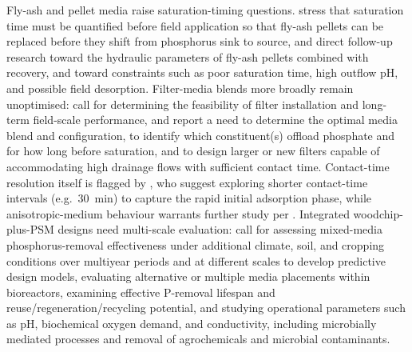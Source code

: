 Fly-ash and pellet media raise saturation-timing questions. \textcite{Li2017} stress that saturation time must be quantified before field application so that fly-ash pellets can be replaced before they shift from phosphorus sink to source, and \textcite{Li2018b} direct follow-up research toward the hydraulic parameters of fly-ash pellets combined with recovery, and toward constraints such as poor saturation time, high outflow pH, and possible field desorption. Filter-media blends more broadly remain unoptimised: \textcite{Agrawal2011} call for determining the feasibility of filter installation and long-term field-scale performance, and \textcite{Agrawal2011b} report a need to determine the optimal media blend and configuration, to identify which constituent(s) offload phosphate and for how long before saturation, and to design larger or new filters capable of accommodating high drainage flows with sufficient contact time. Contact-time resolution itself is flagged by \textcite{Kumari2025}, who suggest exploring shorter contact-time intervals (e.g.\ 30~min) to capture the rapid initial adsorption phase, while anisotropic-medium behaviour warrants further study per \textcite{Kankarej2023}. Integrated woodchip-plus-PSM designs need multi-scale evaluation: \textcite{Husk2018} call for assessing mixed-media phosphorus-removal effectiveness under additional climate, soil, and cropping conditions over multiyear periods and at different scales to develop predictive design models, evaluating alternative or multiple media placements within bioreactors, examining effective P-removal lifespan and reuse/regeneration/recycling potential, and studying operational parameters such as pH, biochemical oxygen demand, and conductivity, including microbially mediated processes and removal of agrochemicals and microbial contaminants.


